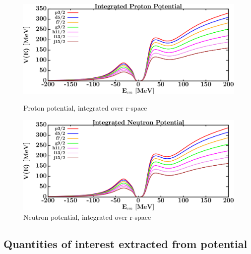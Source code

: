 \begin{figure}[H]
    \centering
    \begin{minipage}{0.45\textwidth}
        \centering
        \includegraphics[width=1.0\textwidth]{figures/o16_protonVolumeIntegrals.png}
        \caption{Proton potential, integrated over r-space}
        \label{DOMFitData_o16_proton_potentialIntegral}
    \end{minipage}\hfill
    \begin{minipage}{0.45\textwidth}
        \centering
        \includegraphics[width=1.0\textwidth]{figures/o16_neutronVolumeIntegrals.png}
        \caption{Neutron potential, integrated over r-space}
        \label{DOMFitData_o16_neutron_potentialIntegral}
    \end{minipage}
\end{figure}

\afterpage{\clearpage}

\subsection{Quantities of interest extracted from potential}

